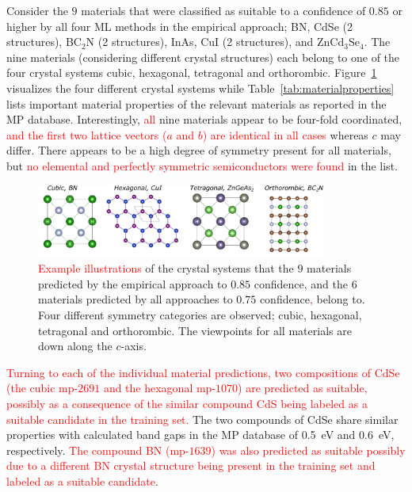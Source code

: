 \documentclass[superscriptaddress,unsortedaddress,
 amsmath,amssymb,
 aps,
]{revtex4-2}
\newcommand{\mrk}[1]{\textcolor{red}{#1}}
\begin{document}
Consider the $9$ materials that were classified as suitable to a confidence of $0.85$ or higher by all four ML methods in the empirical approach; BN, CdSe (2 structures), BC$_2$N (2 structures), InAs, CuI (2 structures), and ZnCd$_3$Se$_4$. 
The nine materials (considering different crystal structures) each belong to one of the four crystal systems cubic, hexagonal, tetragonal and orthorombic. Figure~\ref{fig:crystalsystems} visualizes the four different crystal systems while Table~\ref{tab:materialproperties} lists important material properties of the relevant materials as reported in the MP database.  Interestingly, \mrk{all} nine materials appear to be four-fold coordinated, \mrk{and the first two lattice vectors ($a$ and $b$) are identical in all cases} whereas $c$ may differ.  
There appears to be a high degree of symmetry present for all materials, but \mrk{no elemental and perfectly symmetric semiconductors were found} in the list. 

\begin{figure}[t]
    \centering
    \includegraphics[width=0.85\textwidth]{figure6.png}
    \caption{\mrk{Example illustrations} of the crystal systems that the $9$ materials predicted by the empirical approach to $0.85$ confidence, and the $6$ materials predicted by all approaches to $0.75$ confidence\mrk{,} belong to. Four different symmetry categories are observed; cubic, hexagonal, tetragonal and orthorombic. The viewpoints for all materials are down along the $c$-axis.   }
    \label{fig:crystalsystems}
\end{figure}

\mrk{Turning to each of the individual material predictions, two compositions of CdSe (the cubic mp-$2691$ and the hexagonal mp-$1070$) are predicted as suitable, possibly as a consequence of the similar compound CdS being labeled as a suitable candidate in the training set.}  
The two compounds of CdSe share similar properties with calculated band gaps in the MP database of \SI{0.5}{\electronvolt} and \SI{0.6}{\electronvolt}, respectively. 
\mrk{The compound BN (mp-$1639$) was also predicted as suitable possibly due to a different BN crystal structure being present in the training set and labeled as a suitable candidate}. 
\end{document}
